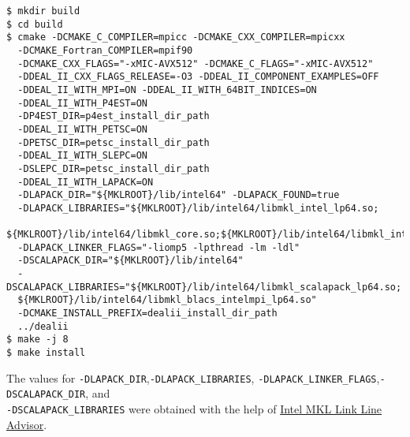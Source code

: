 \begin{verbatim}
$ mkdir build
$ cd build
$ cmake -DCMAKE_C_COMPILER=mpicc -DCMAKE_CXX_COMPILER=mpicxx 
  -DCMAKE_Fortran_COMPILER=mpif90
  -DCMAKE_CXX_FLAGS="-xMIC-AVX512" -DCMAKE_C_FLAGS="-xMIC-AVX512"
  -DDEAL_II_CXX_FLAGS_RELEASE=-O3 -DDEAL_II_COMPONENT_EXAMPLES=OFF
  -DDEAL_II_WITH_MPI=ON -DDEAL_II_WITH_64BIT_INDICES=ON
  -DDEAL_II_WITH_P4EST=ON
  -DP4EST_DIR=p4est_install_dir_path
  -DDEAL_II_WITH_PETSC=ON 
  -DPETSC_DIR=petsc_install_dir_path
  -DDEAL_II_WITH_SLEPC=ON
  -DSLEPC_DIR=petsc_install_dir_path
  -DDEAL_II_WITH_LAPACK=ON
  -DLAPACK_DIR="${MKLROOT}/lib/intel64" -DLAPACK_FOUND=true
  -DLAPACK_LIBRARIES="${MKLROOT}/lib/intel64/libmkl_intel_lp64.so;
  ${MKLROOT}/lib/intel64/libmkl_core.so;${MKLROOT}/lib/intel64/libmkl_intel_thread.so" 
  -DLAPACK_LINKER_FLAGS="-liomp5 -lpthread -lm -ldl"
  -DSCALAPACK_DIR="${MKLROOT}/lib/intel64"
  -DSCALAPACK_LIBRARIES="${MKLROOT}/lib/intel64/libmkl_scalapack_lp64.so;
  ${MKLROOT}/lib/intel64/libmkl_blacs_intelmpi_lp64.so"
  -DCMAKE_INSTALL_PREFIX=dealii_install_dir_path
  ../dealii
$ make -j 8
$ make install
\end{verbatim}
The values for \verb|-DLAPACK_DIR|,\verb|-DLAPACK_LIBRARIES|, \verb|-DLAPACK_LINKER_FLAGS|,\verb|-DSCALAPACK_DIR|, and\\ \verb|-DSCALAPACK_LIBRARIES| were obtained with the help of \href{https://software.intel.com/en-us/articles/intel-mkl-link-line-advisor}{Intel MKL Link Line Advisor}.\\ 


